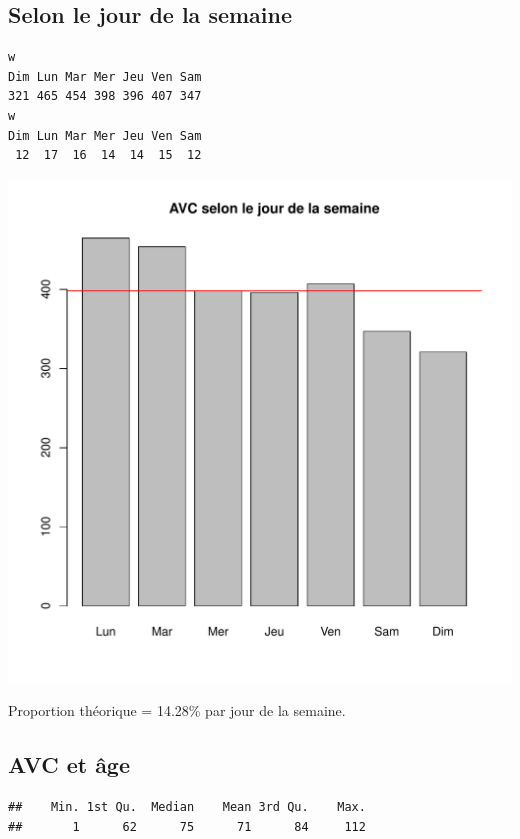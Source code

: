 \documentclass[12pt,english,french,twoside]{book}\usepackage[]{graphicx}\usepackage[]{color}
\makeatletter
\def\maxwidth{ %
  \ifdim\Gin@nat@width>\linewidth
    \linewidth
  \else
    \Gin@nat@width
  \fi
}
\newenvironment{kframe}{%
 \def\at@end@of@kframe{}%
 \ifinner\ifhmode%
  \def\at@end@of@kframe{\end{minipage}}%
  \begin{minipage}{\columnwidth}%
 \fi\fi%
 \def\FrameCommand##1{\hskip\@totalleftmargin \hskip-\fboxsep
 \colorbox{shadecolor}{##1}\hskip-\fboxsep
     \hskip-\linewidth \hskip-\@totalleftmargin \hskip\columnwidth}%
 \MakeFramed {\advance\hsize-\width
   \@totalleftmargin\z@ \linewidth\hsize
   \@setminipage}}%
 {\par\unskip\endMakeFramed%
 \at@end@of@kframe}
\newenvironment{knitrout}{}{} %
\makeatother
\begin{document}
\subsection*{Selon le jour de la semaine}

\begin{knitrout}
\color{fgcolor}\begin{kframe}
\begin{verbatim}
w
Dim Lun Mar Mer Jeu Ven Sam 
321 465 454 398 396 407 347 
w
Dim Lun Mar Mer Jeu Ven Sam 
 12  17  16  14  14  15  12 
\end{verbatim}
\end{kframe}
\includegraphics[width=\maxwidth]{figure/avc_jour_semaine} 

\end{knitrout}

Proportion théorique = 14.28\% par jour de la semaine.

\subsection*{AVC et âge}
\begin{knitrout}
\color{fgcolor}\begin{kframe}
\begin{verbatim}
##    Min. 1st Qu.  Median    Mean 3rd Qu.    Max. 
##       1      62      75      71      84     112
\end{verbatim}
\end{kframe}
\end{knitrout}
\end{document}
